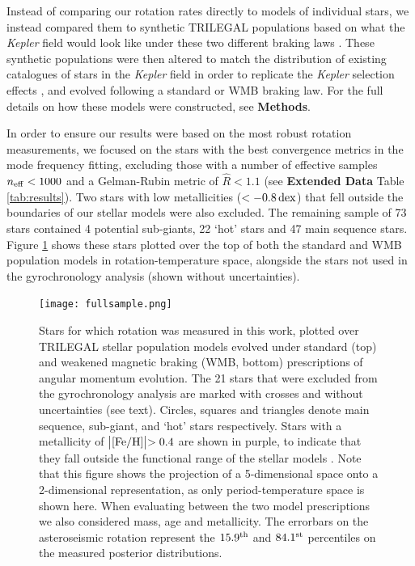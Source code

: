 \documentclass[12pt]{article}
\newcommand{\feh}{\mbox{$\rm{[Fe/H]}$}\xspace}
\newcommand{\kepler}{\emph{Kepler}\xspace}
\begin{document}
Instead of comparing our rotation rates directly to models of individual stars, we instead compared them to synthetic TRILEGAL populations based on what the \textit{Kepler} field would look like under these two different braking laws \cite{vansaders+2019, girardi+2012}. These synthetic populations were then altered to match the distribution of existing catalogues of stars in the \kepler field in order to replicate the \kepler selection effects \cite{berger+2020}, and evolved following a standard or WMB braking law. For the full details on how these models were constructed, see \textbf{Methods}.

In order to ensure our results were based on the most robust rotation measurements, we focused on the stars with the best convergence metrics in the mode frequency fitting, excluding those with a number of effective samples $n_{\rm eff} < 1000$ and a Gelman-Rubin metric of $\hat{R}<1.1$ \cite{gelman+rubin1992,salvatier+2016} (see \textbf{Extended Data} Table \ref{tab:results}). Two stars with low metallicities ($< -0.8\, \rm {dex}$) that fell outside the boundaries of our stellar models were also excluded. The remaining sample of 73 stars contained 4 potential sub-giants, 22 `hot' stars and 47 main sequence stars. Figure \ref{fig:fullsample} shows these stars plotted over the top of both the standard and WMB population models in rotation-temperature space, alongside the stars not used in the gyrochronology analysis (shown without uncertainties).

\begin{figure}
	\centering
	\texttt{[image: fullsample.png]}
	\caption{Stars for which rotation was measured in this work, plotted over TRILEGAL \cite{girardi+2012} stellar population models evolved under standard (top) and weakened magnetic braking (WMB, bottom) prescriptions of angular momentum evolution. The 21 stars that were excluded from the gyrochronology analysis are marked with crosses and without uncertainties (see text). Circles, squares and triangles denote main sequence, sub-giant, and `hot' stars respectively. Stars with a metallicity of $\bigl\lvert \feh \bigl\rvert > 0.4$ are shown in purple, to indicate that they fall outside the functional range of the stellar models  \cite{vansaders+2019}. Note that this figure shows the projection of a 5-dimensional space onto a 2-dimensional representation, as only period-temperature space is shown here. When evaluating between the two model prescriptions we also considered mass, age and metallicity. The errorbars on the asteroseismic rotation represent the $15.9^{\rm th}$ and $84.1^{\rm st}$ percentiles on the measured posterior distributions.}
	\label{fig:fullsample}
\end{figure}
\end{document}
